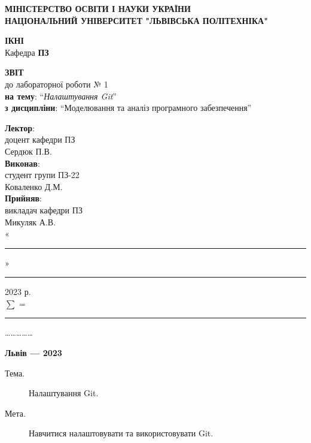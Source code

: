 \documentclass[oneside,14pt]{extarticle}
\newcommand\subject{Моделювання та аналіз програмного забезпечення}
\newcommand\lecturer{доцент кафедри ПЗ \\ Сердюк П.В.}
\newcommand\teacher{викладач кафедри ПЗ \\ Микуляк А.В.}
\newcommand\mygroup{ПЗ-22}
\newcommand\lab{1}
\newcommand\theme{Налаштування Git}
\newcommand\purpose{Навчитися налаштовувати та використовувати Git}
\begin{document}
\begin{normalsize}
	\begin{titlepage}
		\thispagestyle{empty}
		\begin{center}
			\textbf{МІНІСТЕРСТВО ОСВІТИ І НАУКИ УКРАЇНИ\\
				НАЦІОНАЛЬНИЙ УНІВЕРСИТЕТ "ЛЬВІВСЬКА ПОЛІТЕХНІКА"}
		\end{center}
		\begin{flushright}
			\textbf{ІКНІ}\\
			Кафедра \textbf{ПЗ}
		\end{flushright}
		\vspace{70pt}
		\begin{center}
			\textbf{ЗВІТ}\\
			\vspace{10pt}
			до лабораторної роботи № \lab\\
			\textbf{на тему}: “\textit{\theme}”\\
			\textbf{з дисципліни}: “\subject”
		\end{center}
		\vspace{50pt}
		\begin{flushright}
			
			\textbf{Лектор}:\\
			\lecturer\\
			\vspace{10pt}
			\textbf{Виконав}:\\
			
			студент групи \mygroup\\
			Коваленко Д.М.\\
			\vspace{10pt}
			\textbf{Прийняв}:\\
			
			\teacher\\
			
			\vspace{28pt}
			«\rule{1cm}{0.15mm}» \rule{1.5cm}{0.15mm} 2023 р.\\
			$\sum$ = \rule{1cm}{0.15mm}……………\\
			
		\end{flushright}
		\vspace{\fill}
		\begin{center}
			\textbf{Львів — 2023}
		\end{center}
	\end{titlepage}
		
	\begin{description}
		\item[Тема.] \theme.
		\item[Мета.] \purpose.
	\end{description}


\end{normalsize}
\end{document}
